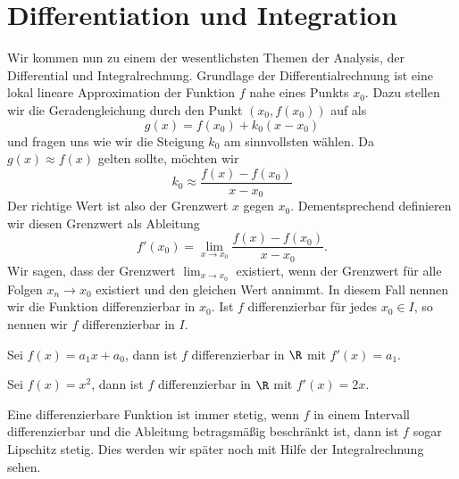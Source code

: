 \documentclass[letterpaper,10pt,english]{jupyterBook}
\begin{document}
\section{Differentiation und Integration}
\label{\detokenize{vorkurs/diffnint:differentiation-und-integration}}\label{\detokenize{vorkurs/diffnint::doc}}
Wir kommen nun zu einem der wesentlichsten Themen der Analysis, der Differential  und Integralrechnung. Grundlage der Differentialrechnung ist eine lokal lineare Approximation der Funktion \(f\) nahe eines Punkts \(x_0\). Dazu stellen wir die Geradengleichung durch den Punkt \((x_0,f(x_0))\) auf als
\begin{equation*}
 g(x) = f(x_0) + k_0 (x-x_0)\end{equation*}
und fragen uns wie wir die Steigung \(k_0\) am sinnvollsten wählen. Da \(g(x) \approx f(x)\) gelten sollte, möchten wir
\begin{equation*}
 k_0 \approx \frac{f(x) - f(x_0)}{x-x_0}\end{equation*}
Der richtige Wert ist also der Grenzwert \(x\) gegen \(x_0\).  Dementsprechend definieren wir diesen Grenzwert als Ableitung
\begin{equation*}
 f'(x_0) = \lim_{x \rightarrow x_0} \frac{f(x) - f(x_0)}{x-x_0}.\end{equation*}
Wir sagen, dass der Grenzwert \(\lim_{x \rightarrow x_0}\) existiert, wenn der Grenzwert für alle Folgen \(x_n \rightarrow x_0\) existiert und den gleichen Wert annimmt. In diesem Fall nennen wir die Funktion differenzierbar in \(x_0\). Ist \(f\) differenzierbar für jedes \(x_0 \in I\), so nennen wir \(f\) differenzierbar in \(I\).
\label{vorkurs/diffnint:example-0}
\begin{example}{}{}



Sei \(f(x) = a_1 x + a_0\), dann ist \(f\) differenzierbar in \(\R\) mit \(f'(x) = a_1\).
\end{example}
\label{vorkurs/diffnint:example-1}
\begin{example}{}{}



Sei \(f(x) = x^2\), dann ist \(f\) differenzierbar in \(\R\) mit \(f'(x) = 2x\).
\end{example}

Eine differenzierbare Funktion ist immer stetig, wenn \(f\) in einem Intervall differenzierbar und die Ableitung betragsmäßig beschränkt ist, dann ist \(f\) sogar Lipschitz stetig. Dies werden wir später noch mit Hilfe der Integralrechnung sehen.
\end{document}
